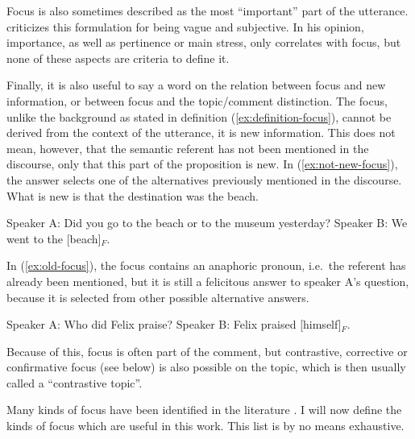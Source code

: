 
Focus is also sometimes described as the most ``important'' part of the utterance. \citet{Krifka.2007} criticizes this formulation for being vague and subjective. In his opinion, importance, as well as pertinence or main stress, only correlates with focus, but none of these aspects are criteria to define it. 


Finally, it is also useful to say a word on the relation between focus and new information, or between focus and the topic/comment distinction. The focus, unlike the background as stated in definition (\ref{ex:definition-focus}), cannot be derived from the context of the utterance, it is new information. This does not mean, however, that the semantic referent has not been mentioned in the discourse, only that this part of the proposition is new. In (\ref{ex:not-new-focus}), the answer selects one of the alternatives previously mentioned in the discourse. What is new is that the destination was the beach. 

\eal \label{ex:not-new-focus}
\ex Speaker A: Did you go to the beach or to the museum yesterday?
\ex Speaker B: We went to the [beach]$_F$.
\zl 

In (\ref{ex:old-focus}), the focus contains an anaphoric pronoun, i.e.\ the referent has already been mentioned, but it is still a felicitous answer to speaker A's question, because it is selected from other possible alternative answers. 

\begin{exe}
\ex \citep{Marandin.2007}
\label{ex:old-focus}
\begin{xlist}
\ex Speaker A: Who did Felix praise?
\ex Speaker B: Felix praised [himself]$_F$.
\end{xlist}
\end{exe}

Because of this, focus is often part of the comment, but contrastive, corrective or confirmative focus (see below) is also possible on the topic, which is then usually called a ``contrastive topic''. 

Many kinds of focus have been identified in the literature \citep[6--34]{Krifka.2007}. I will now define the kinds of focus which are useful in this work. This list is by no means exhaustive.


